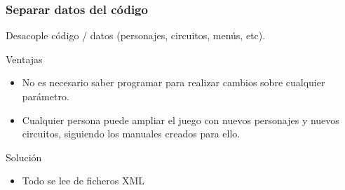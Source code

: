 \begin{frame}
    \frametitle{Separar datos del código}

        Desacople código / datos (personajes, circuitos, menús, etc).\\
        \begin{block}{Ventajas}
            \begin{itemize}
                \item No es necesario saber programar para realizar cambios sobre cualquier parámetro.
                \item Cualquier persona puede ampliar el juego con nuevos personajes y nuevos circuitos, siguiendo
                los manuales creados para ello.
            \end{itemize}
        \end{block}
        \begin{block}{Solución}
            \begin{itemize}
                \item Todo se lee de ficheros XML
            \end{itemize}
        \end{block}

\end{frame}

